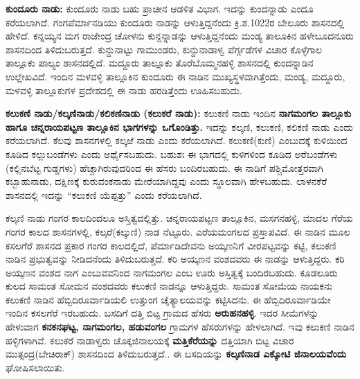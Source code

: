 \newpage

\textbf{ಕುಂದೂರು ನಾಡು:} ಕುಂದೂರು ನಾಡು ಬಹು ಪ್ರಾಚೀನ ಆಡಳಿತ ವಿಭಾಗ. ಇದನ್ನು ಕುಂದನ್ನಾಡು ಎಂದೂ ಕರೆಯಲಾಗಿದೆ. ಗಂಗಪೆರ್ಮಾನಡಿಯು ಕುಂದೂರು ನಾಡನ್ನು ಆಳುತ್ತಿದ್ದನೆಂದು ಕ್ರಿ.ಶ.1022ರ ಬೇಲೂರು ಶಾಸನದಲ್ಲಿ ಹೇಳಿದೆ. ಕನ್ನಯ್ಯನ ಮಗ ರಾಜೇಂದ್ರ ಚೋಳನು ಕುನ್ದನ್ನಾಡನ್ನು ಆಳುತ್ತಿದ್ದನೆಂದು ಮಂಡ್ಯ ತಾಲೂಕಿನ ಹಳೇಬೂದನೂರು ಶಾಸನದಿಂದ ತಿಳಿದುಬರುತ್ತದೆ. ಕುನ್ದುನಾಟ್ಟು ಗಾಮುಂಡರು, ಕುನ್ದುನಾಡಾಳ್ವ ಪೆರ್ಗ್ಗಡೆಗಳ ವಿಚಾರ ಕೊಳ್ಳೆಗಾಲ ತಾಲ್ಲೂಕು ಪಾಲ್ಯಂ ಶಾಸನದಲ್ಲಿದೆ. ಮದ್ದೂರು ತಾಲ್ಲೂಕು ತೊರೆಬೊಮ್ಮನಹಳ್ಳಿ ಶಾಸನದಲ್ಲಿ ಕುಂದನ್ನಾಡಿನ ಉಲ್ಲೇಖವಿದೆ. ಇಂದಿನ ಮಳವಳ್ಳಿ ತಾಲ್ಲೂಕಿನ ಕುಂದೂರು ಈ ನಾಡಿನ ಮುಖ್ಯಸ್ಥಳವಾಗಿತ್ತೆಂದು, ಮಂಡ್ಯ, ಮದ್ದೂರು, ಮಳವಳ್ಳಿ ತಾಲ್ಲೂಕುಗಳ ಪ್ರದೇಶದಲ್ಲಿ ಈ ನಾಡು ಹರಡಿತ್ತೆಂದು ಊಹಿಸಬಹುದು.

\textbf{ಕಲುಕಣಿ ನಾಡು/ಕಲ್ಕಣಿನಾಡು/ಕಲಿಕಣಿನಾಡು (ಕಲುಕರೆ ನಾಡು):} ಕಲುಕಣಿ ನಾಡು ಇಂದಿನ \textbf{ನಾಗಮಂಗಲ ತಾಲ್ಲೂಕು ಹಾಗೂ ಚನ್ನರಾಯಪಟ್ಟಣ ತಾಲ್ಲೂಕಿನ ಭಾಗಗಳನ್ನು ಒಗೊಂಡಿತ್ತು.} ಇದನ್ನು ಕಲ್ಕಣಿ, ಕಲುಕಣಿ, ಕಲಿಕಣಿ ನಾಡು ಎಂದು ಕರೆಯಲಾಗಿದೆ. ಕೆಲವು ಶಾಸನಗಳಲ್ಲಿ ಕಲ್ಕಱೆ ನಾಡು ಎಂದು ಕರೆಯಲಾಗಿದೆ. ಕಲುಕಣಿ(ಕುಣಿ) ಎಂಬುದಕ್ಕೆ ಕುಳಿಯಿಂದ ಕೂಡಿದ ಕಲ್ಲುಬಂಡೆಗಳು ಎಂದು ಅರ್ಥೈಸಬಹುದು. ಬಹುಶಃ ಈ ಭಾಗದಲ್ಲಿ ಕುಳಿಗಳಿಂದ ಕೂಡಿದ ಅರೆಬಂಡೆಗಳು (ಕಲ್ಲಿನಬೆಟ್ಟ ಗುಡ್ಡಗಳು) ಹೆಚ್ಚಾಗಿರುವುದರಿಂದ ಈ ಹೆಸರು ಬಂದಿರಬಹುದು. ಈ ನಾಡಿಗೆ ಪಶ್ಚಿಮೋತ್ತರವಾಗಿ ಕಬ್ಬಾಹುನಾಡು, ದಕ್ಷಿಣಕ್ಕೆ ಕುರುವಂಕನಾಡು ಮೇರೆಯಾಗಿದ್ದವು ಎಂದು ಸ್ಥೂಲವಾಗಿ ಹೇಳಬಹುದು. ಲಾಳನಕೆರೆ ಶಾಸನದಲ್ಲಿ ಇದನ್ನು “ಕಲುಕಣಿ ಯೆಪ್ಪತ್ತು” ಎಂದು ಕರೆಯಲಾಗಿದೆ.

ಕಲ್ಕಣಿ ನಾಡು ಗಂಗರ ಕಾಲದಿಂದಲೂ ಅಸ್ತಿತ್ವದಲ್ಲಿತ್ತು. ಚನ್ನರಾಯಪಟ್ಟಣ ತಾಲ್ಲೂಕಿನ, ಮಸಗನಹಳ್ಳಿ, ಮಾದಲ ಗೆರೆಯ ಗಂಗರ ಕಾಲದ ಶಾಸನಗಳಲ್ಲಿ, ಕಲ್ಕರೆ(ಕಲ್ಕುಣಿ) ನಾಡ ನೆಟ್ಟೂರು. ಎರೆಯಮಂಗಲದ ಪ್ರಸ್ತಾಪವಿದೆ. ಈ ನಾಡಿನ ಮೂಲ ಕಸಲಗೆರೆ ಶಾಸನದ ಪ್ರಕಾರ ಗಂಗರ ಕಾಲದಲ್ಲಿದೆ, ಪೆರ್ಮಾಡಿದೇವನು ಅಯ್ಕಣನಿಗೆ ವೀರಪಟ್ಟವನ್ನು ಕಟ್ಟಿ, ಕಲುಕಣಿ ನಾಡಿನ ಪ್ರಭುತ್ವವನ್ನು ನೀಡಿದನೆಂದು ತಿಳಿದುಬರುತ್ತದೆ. ಕರಿ ಅಯ್ಕಣನ ವಂಶದವರು ಈ ನಾಡನ್ನು ಆಳುತ್ತಿದ್ದರು. ಕರಿ ಅಯ್ಕಣನ ವಂಶದ ನಾಗ ಎಂಬುವವನಿಂದ ನಾಗಮಂಗಲ ಎಂಬ ಊರು ಅಸ್ತಿತ್ವಕ್ಕೆ ಬಂದಿರಬಹುದು. ಕೂಡಲೂರು ಕುಲದ ಸಾಮಂತ ಸೋಮನ ವಂಶದವರು ಕಲುಕಣಿ ನಾಡನ್ನೂ ಆಳುತ್ತಿದ್ದರು. ಸಾಮಂತ ಸೋಮೆಯ ನಾಯಕನು ಕಲುಕಣಿ ನಾಡಿನ ಹೆಬ್ಬಿದಿರೂರ್ವಾಡಿಯಲಿ ಉತ್ತುಂಗ ಚೈತ್ಯಾಲಯವನ್ನು ಕಟ್ಟಿಸಿದನು. ಈ ಹೆಬ್ಬಿದಿರೂರ್ವಾಡಿಯೇ ಇಂದಿನ ಕಸಲಗೆರೆ ಇರಬಹುದು. ಬಸದಿಗೆ ದತ್ತಿ ಬಿಟ್ಟ ಗ್ರಾಮದ ಹೆಸರು \textbf{ಅರುಹನಹಳ್ಳಿ}. ಇದರ ಸೀಮೆಗಳನ್ನು ಹೇಳುವಾಗ \textbf{ಕನಕನಘಟ್ಟ, ನಾಗಮಂಗಲ, ಹಡುವಂಗಲ} ಗ್ರಾಮಗಳ ಹೆಸರುಗಳನ್ನು ಹೇಳಲಾಗಿದೆ. ಇವು ಕಲುಕಣಿ ನಾಡಿನ ಹಳ್ಳಿಗಳಾಗಿವೆ. ಕಲುಕರೆ ನಾಡಾಳ್ವರು ಚೊಕ್ಕಜಿನಾಲಯಕ್ಕೆ \textbf{ಮತ್ತಿಕೆರೆಯನ್ನು} ದತ್ತಿಯಾಗಿ ಬಿಟ್ಟ ವಿಚಾರ ಮುತ್ಸಂದ್ರ(ಬೇಚಿರಾಕ್​) ಶಾಸನದಿಂದ ತಿಳಿದುಬರುತ್ತದೆ.. ಈ ಬಸದಿಯನ್ನು \textbf{ಕಲ್ಕಣಿನಾಡ ಎಕ್ಕೋಟಿ ಜಿನಾಲಯವೆಂದು} ಘೋಷಿಸಲಾಯಿತು.


